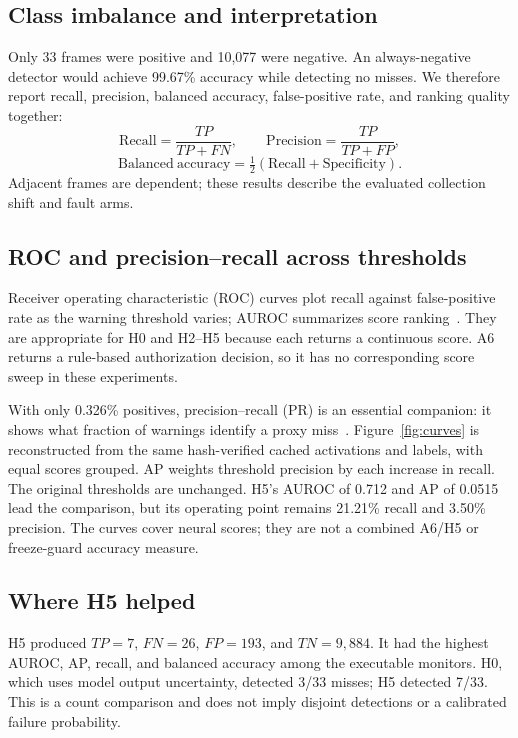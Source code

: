 \documentclass[sigconf,nonacm]{acmart}
\begin{document}
\subsection{Class imbalance and interpretation}
Only 33 frames were positive and 10,077 were negative. An always-negative detector would achieve 99.67\% accuracy while detecting no misses. We therefore report recall, precision, balanced accuracy, false-positive rate, and ranking quality together:
\[
\mathrm{Recall}=\frac{TP}{TP+FN},\qquad
\mathrm{Precision}=\frac{TP}{TP+FP},
\]
\[
\mathrm{Balanced\ accuracy}=\tfrac12(\mathrm{Recall}+\mathrm{Specificity}).
\]
Adjacent frames are dependent; these results describe the evaluated collection shift and fault arms.

\subsection{ROC and precision--recall across thresholds}
Receiver operating characteristic (ROC) curves plot recall against false-positive rate as the warning threshold varies; AUROC summarizes score ranking~\cite{fawcett}. They are appropriate for H0 and H2--H5 because each returns a continuous score. A6 returns a rule-based authorization decision, so it has no corresponding score sweep in these experiments.

With only 0.326\% positives, precision--recall (PR) is an essential companion: it shows what fraction of warnings identify a proxy miss~\cite{saito}. Figure~\ref{fig:curves} is reconstructed from the same hash-verified cached activations and labels, with equal scores grouped. AP weights threshold precision by each increase in recall. The original thresholds are unchanged. H5's AUROC of 0.712 and AP of 0.0515 lead the comparison, but its operating point remains 21.21\% recall and 3.50\% precision. The curves cover neural scores; they are not a combined A6/H5 or freeze-guard accuracy measure.


\vspace{-3pt}


\subsection{Where H5 helped}
H5 produced $TP=7$, $FN=26$, $FP=193$, and $TN=9{,}884$. It had the highest AUROC, AP, recall, and balanced accuracy among the executable monitors. H0, which uses model output uncertainty, detected 3/33 misses; H5 detected 7/33. This is a count comparison and does not imply disjoint detections or a calibrated failure probability.
\end{document}

